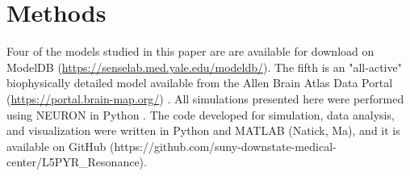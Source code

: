 \documentclass[utf8]{frontiersSCNS} %
\begin{document}
\section{Methods}
Four of the models studied in this paper \citep{Kole2008-aj, Acker2009-yj, Hay2011-if, Neymotin2017-dr} are
are available for download on ModelDB (\url{https://senselab.med.yale.edu/modeldb/}).  The fifth is an "all-active"
biophysically detailed model available from the Allen Brain Atlas Data Portal (\url{https://portal.brain-map.org/}) \citep{Reimann2013-mg, Shai2015-ff, Markram2015-zg}.
All simulations presented here were performed using NEURON in Python \citep{Hines2009-qx}.  The code 
developed for simulation, data analysis, and visualization were written in Python and MATLAB (Natick, Ma), and it
is available on GitHub (https://github.com/suny-downstate-medical-center/L5PYR\_Resonance).
\end{document}
